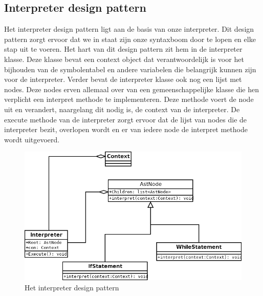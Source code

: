 \documentclass[11pt,a4paper]{article}
\begin{document}
\subsection{Interpreter design pattern}
Het interpreter design pattern ligt aan de basis van onze interpreter. Dit design pattern zorgt ervoor dat we in staat zijn onze syntaxboom door te lopen en elke stap uit te voeren. Het hart van dit design pattern zit hem in de interpreter klasse. Deze klasse bevat een context object dat verantwoordelijk is voor het bijhouden van de symbolentabel en andere variabelen die belangrijk kunnen zijn voor de interpreter. Verder bevat de interpreter klasse ook nog een lijst met nodes. Deze nodes erven allemaal over van een gemeenschappelijke klasse die hen verplicht een interpret methode te implementeren. Deze methode voert de node uit en verandert, naargelang dit nodig is, de context van de interpreter. De execute methode van de interpreter zorgt ervoor dat de lijst van nodes die de interpreter bezit, overlopen wordt en er van iedere node de interpret methode wordt uitgevoerd.

\begin{figure}[ht]
\centering
\includegraphics[width=\textwidth]{afbeeldingen/interpreter_small}
\caption{Het interpreter design pattern}
\end{figure}
\end{document}

